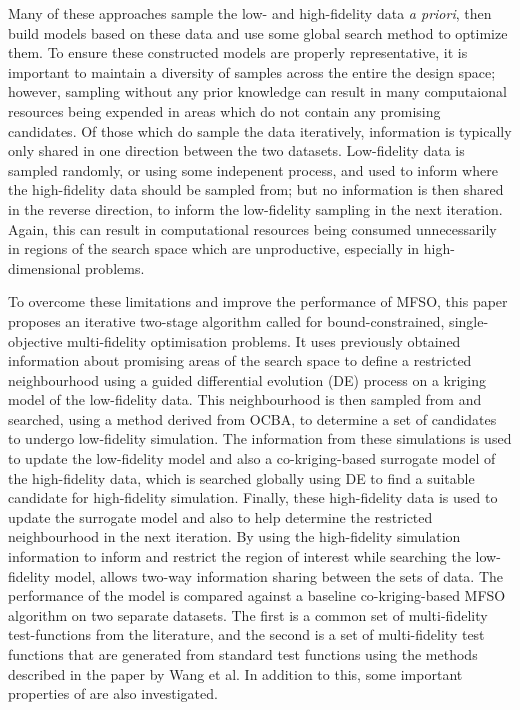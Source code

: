 \documentclass[journal]{IEEEtran}
\begin{document}
Many of these approaches sample the low- and high-fidelity data \emph{a priori}, then build models based on these data and use some global search method to optimize them. To ensure these constructed models are properly representative, it is important to maintain a diversity of samples across the entire the design space; however, sampling without any prior knowledge can result in many computaional resources being expended in areas which do not contain any promising candidates. Of those which do sample the data iteratively, information is typically only shared in one direction between the two datasets. Low-fidelity data is sampled randomly, or using some indepenent process, and used to inform where the high-fidelity data should be sampled from; but no information is then shared in the reverse direction, to inform the low-fidelity sampling in the next iteration. Again, this can result in computational resources being consumed unnecessarily in regions of the search space which are unproductive, especially in high-dimensional problems. 


To overcome these limitations and improve the performance of MFSO, this paper proposes an iterative two-stage algorithm called \AlgName{} for bound-constrained, single-objective multi-fidelity optimisation problems. It uses previously obtained information about promising areas of the search space to define a restricted neighbourhood using a guided differential evolution (DE) process on a kriging model of the low-fidelity data. This neighbourhood is then sampled from and searched, using a method derived from OCBA, to determine a set of candidates to undergo low-fidelity simulation. The information from these simulations is used to update the low-fidelity model and also a co-kriging-based surrogate model of the high-fidelity data, which is searched globally using DE to find a suitable candidate for high-fidelity simulation. Finally, these high-fidelity data is used to update the surrogate model and also to help determine the restricted neighbourhood in the next iteration. By using the high-fidelity simulation information to inform and restrict the region of interest while searching the low-fidelity model, \AlgName{} allows two-way information sharing between the sets of data. The performance of the \AlgName{} model is compared against a baseline co-kriging-based MFSO algorithm on two separate datasets. The first is a common set of multi-fidelity test-functions from the literature, and the second is a set of multi-fidelity test functions that are generated from standard test functions using the methods described in the paper by Wang et al. In addition to this, some important properties of \AlgName{} are also investigated.
\end{document}
